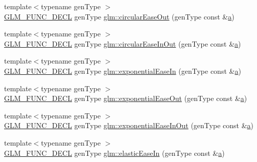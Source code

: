 \begin{DoxyCompactItemize}
\item 
{\footnotesize template$<$typename gen\+Type $>$ }\\\hyperlink{setup_8hpp_ab2d052de21a70539923e9bcbf6e83a51}{G\+L\+M\+\_\+\+F\+U\+N\+C\+\_\+\+D\+E\+CL} gen\+Type \hyperlink{group__gtx__easing_ga26fefde9ced9b72745fe21f1a3fe8da7}{glm\+::circular\+Ease\+Out} (gen\+Type const \&\hyperlink{_s_d_l__opengl__glext_8h_a3309789fc188587d666cda5ece79cf82}{a})
\item 
{\footnotesize template$<$typename gen\+Type $>$ }\\\hyperlink{setup_8hpp_ab2d052de21a70539923e9bcbf6e83a51}{G\+L\+M\+\_\+\+F\+U\+N\+C\+\_\+\+D\+E\+CL} gen\+Type \hyperlink{group__gtx__easing_ga0c1027637a5b02d4bb3612aa12599d69}{glm\+::circular\+Ease\+In\+Out} (gen\+Type const \&\hyperlink{_s_d_l__opengl__glext_8h_a3309789fc188587d666cda5ece79cf82}{a})
\item 
{\footnotesize template$<$typename gen\+Type $>$ }\\\hyperlink{setup_8hpp_ab2d052de21a70539923e9bcbf6e83a51}{G\+L\+M\+\_\+\+F\+U\+N\+C\+\_\+\+D\+E\+CL} gen\+Type \hyperlink{group__gtx__easing_ga7f24ee9219ab4c84dc8de24be84c1e3c}{glm\+::exponential\+Ease\+In} (gen\+Type const \&\hyperlink{_s_d_l__opengl__glext_8h_a3309789fc188587d666cda5ece79cf82}{a})
\item 
{\footnotesize template$<$typename gen\+Type $>$ }\\\hyperlink{setup_8hpp_ab2d052de21a70539923e9bcbf6e83a51}{G\+L\+M\+\_\+\+F\+U\+N\+C\+\_\+\+D\+E\+CL} gen\+Type \hyperlink{group__gtx__easing_ga517f2bcfd15bc2c25c466ae50808efc3}{glm\+::exponential\+Ease\+Out} (gen\+Type const \&\hyperlink{_s_d_l__opengl__glext_8h_a3309789fc188587d666cda5ece79cf82}{a})
\item 
{\footnotesize template$<$typename gen\+Type $>$ }\\\hyperlink{setup_8hpp_ab2d052de21a70539923e9bcbf6e83a51}{G\+L\+M\+\_\+\+F\+U\+N\+C\+\_\+\+D\+E\+CL} gen\+Type \hyperlink{group__gtx__easing_ga232fb6dc093c5ce94bee105ff2947501}{glm\+::exponential\+Ease\+In\+Out} (gen\+Type const \&\hyperlink{_s_d_l__opengl__glext_8h_a3309789fc188587d666cda5ece79cf82}{a})
\item 
{\footnotesize template$<$typename gen\+Type $>$ }\\\hyperlink{setup_8hpp_ab2d052de21a70539923e9bcbf6e83a51}{G\+L\+M\+\_\+\+F\+U\+N\+C\+\_\+\+D\+E\+CL} gen\+Type \hyperlink{group__gtx__easing_ga230918eccee4e113d10ec5b8cdc58695}{glm\+::elastic\+Ease\+In} (gen\+Type const \&\hyperlink{_s_d_l__opengl__glext_8h_a3309789fc188587d666cda5ece79cf82}{a})

\end{DoxyCompactItemize}
